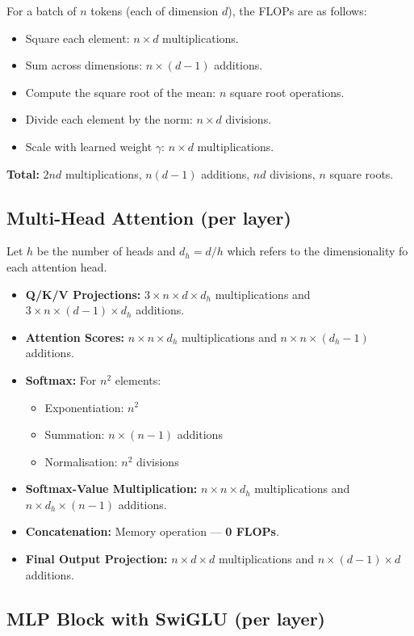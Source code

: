 \documentclass[a4paper,12pt]{article}
\begin{document}
For a batch of $n$ tokens (each of dimension $d$), the FLOPs are as follows:
\begin{itemize}
  \item Square each element: $n \times d$ multiplications.
  \item Sum across dimensions: $n \times (d - 1)$ additions.
  \item Compute the square root of the mean: $n$ square root operations.
  \item Divide each element by the norm: $n \times d$ divisions.
  \item Scale with learned weight $\gamma$: $n \times d$ multiplications.
\end{itemize}

\textbf{Total:} $2nd$ multiplications, $n(d - 1)$ additions, $nd$ divisions, $n$ square roots.


\subsection*{Multi-Head Attention (per layer)}
Let $h$ be the number of heads and $d_h = d / h$ which refers to the dimensionality fo each attention head.
\begin{itemize}
  \item \textbf{Q/K/V Projections:} $3 \times n \times d \times d_h$ multiplications and $3 \times n \times (d - 1) \times d_h$ additions.
  \item \textbf{Attention Scores:} $n \times n \times d_h$ multiplications and $n \times n \times (d_h - 1)$ additions.
  \item \textbf{Softmax:} For $n^2$ elements:
    \begin{itemize}
      \item Exponentiation: $n^2$
      \item Summation: $n \times (n - 1)$ additions
      \item Normalisation: $n^2$ divisions
    \end{itemize}
  \item \textbf{Softmax-Value Multiplication:} $n \times n \times d_h$ multiplications and $n \times d_h \times (n - 1)$ additions.
  \item \textbf{Concatenation:} Memory operation — \textbf{0 FLOPs}.
  \item \textbf{Final Output Projection:} $n \times d \times d$ multiplications and $n \times (d - 1) \times d$ additions.
\end{itemize}

\subsection*{MLP Block with SwiGLU (per layer)}
\end{document}
